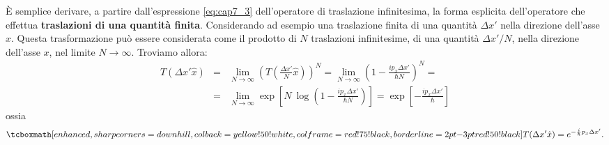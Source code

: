 \documentclass[a4paper,12pt,oneside]{book}
\begin{document}
È semplice derivare, a partire dall'espressione \eqref{eq:cap7_3} dell'operatore di traslazione infinitesima, la forma esplicita dell'operatore che effettua \textbf{traslazioni di una quantità finita}. Considerando ad esempio una traslazione finita di una quantità $\Delta x '$ nella direzione dell'asse $x$. Questa trasformazione può essere considerata come il prodotto di $N$ traslazioni infinitesime, di una quantità $\Delta x ' / N$, nella direzione dell'asse $x$, nel limite $N\rightarrow \infty $. Troviamo allora:
	\begin{eqnarray}
	T(\Delta x'\hat{x}) & = & \lim _{N\rightarrow \infty} \left(T \left( \frac{\Delta x'}{N}\hat{x} \right) \right) ^N = \lim _{N\rightarrow \infty} \left( 1- \frac{i p_x \Delta x'}{\hbar N} \right) ^N =\nonumber \\
	&=& \lim _{N\rightarrow \infty} \exp \left[N\ \log \left(1- \frac{i p_x \Delta x'}{\hbar N}  \right) \right] =   \exp \left[  -\frac{i p_x \Delta x'}{\hbar}  \right] 
	\end{eqnarray}
ossia
	\begin{equation}
		\tcboxmath[enhanced,sharp corners=downhill ,colback=yellow!50!white,colframe=red!75!black, borderline={2pt}{-3pt}{red!50!black}]{	
			T(\Delta x'\hat{x}) = e^{-\frac{i}{\hbar} p_x \Delta x' }.
			}
	\end{equation}
\end{document}
